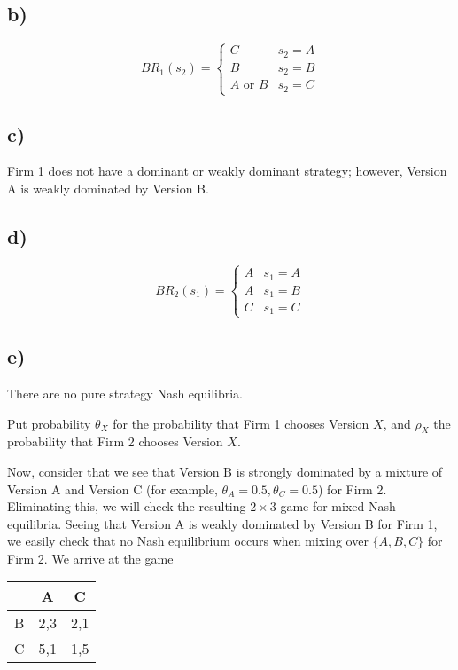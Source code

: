 \documentclass[12pt,letterpaper]{article}
\theoremstyle{definition}
\begin{document}
\subsection*{b)}

\[
  BR_1(s_2) = \begin{cases}
    C & s_2 = A \\
    B & s_2 = B \\
    A \text{ or } B & s_2 = C
  \end{cases}
\]

\subsection*{c)}

Firm 1 does not have a dominant or weakly dominant strategy; however, Version A
is weakly dominated by Version B.

\subsection*{d)}

\[
  BR_2(s_1) = \begin{cases}
    A & s_1 = A \\
    A & s_1 = B \\
    C & s_1 = C
  \end{cases}
\]

\subsection*{e)}

There are no pure strategy Nash equilibria. 

Put probability $\theta_X$ for the probability that Firm 1 chooses
Version $X$, and $\rho_X$ the probability that Firm 2 chooses Version $X$. 

Now, consider that we see that Version B is strongly dominated by a mixture of
Version A and Version C (for example, $\theta_A = 0.5, \theta_C = 0.5$) for
Firm 2. Eliminating this, we will check the resulting $2\times3$ game for mixed
Nash equilibria. Seeing that Version A is weakly dominated by Version B for
Firm 1, we easily check that no Nash equilibrium occurs when mixing over $\{A, B, C\}$
for Firm 2. We arrive at the game

\begin{center}
  \begin{tabular}{c|c|c}
    & A & C \\
    \hline
    B & 2,3 & 2,1\\
    \hline
    C & 5,1 & 1,5
  \end{tabular}
\end{center}
\end{document}
